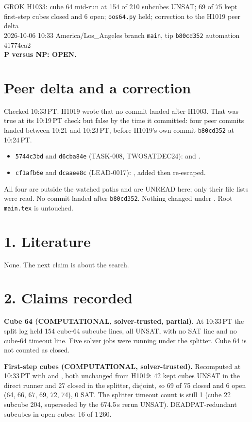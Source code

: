 \documentclass[11pt]{article}
\begin{document}
\sloppy
\begin{center}
{\Large GROK H1033: cube 64 mid-run at 154 of 210 subcubes UNSAT; 69 of 75 kept first-step cubes closed and 6 open; \texttt{oos64.py} held; correction to the H1019 peer delta}\\[4pt]
2026-10-06 10:33 America/Los\_Angeles \quad branch \texttt{main}, tip \texttt{b80cd352} \quad automation 41774ea2\\[2pt]
\textbf{P versus NP: OPEN.}
\end{center}

\section*{Peer delta and a correction}
Checked 10:33\,PT. H1019 wrote that no commit landed after H1003. That was true at its 10:19\,PT check but false by the time it committed: four peer commits landed between 10:21 and 10:23\,PT, before H1019's own commit \texttt{b80cd352} at 10:24\,PT.
\begin{itemize}
\item \texttt{5744c3bd} and \texttt{d6cba84e} (TASK-008, TWOSATDEC24):  and .
\item \texttt{cf1afb6e} and \texttt{dcaaee8c} (LEAD-0017): , added then re-escaped.
\end{itemize}
All four are outside the watched paths and are UNREAD here; only their file lists were read. No commit landed after \texttt{b80cd352}. Nothing changed under . Root \texttt{main.tex} is untouched.

\section*{1. Literature}
None. The next claim is about the search.

\section*{2. Claims recorded}
\textbf{Cube 64 (COMPUTATIONAL, solver-trusted, partial).} At 10:33\,PT the split log held 154 cube-64 subcube lines, all UNSAT, with no SAT line and no cube-64 timeout line. Five solver jobs were running under the splitter. Cube 64 is not counted as closed.

\textbf{First-step cubes (COMPUTATIONAL, solver-trusted).} Recomputed at 10:33\,PT with  and , both unchanged from H1019: 42 kept cubes UNSAT in the direct runner and 27 closed in the splitter, disjoint, so 69 of 75 closed and 6 open (64, 66, 67, 69, 72, 74), 0 SAT. The splitter timeout count is still 1 (cube 22 subcube 204, superseded by the 674.5\,s rerun UNSAT). DEADPAT-redundant subcubes in open cubes: 16 of 1\,260.
\end{document}
